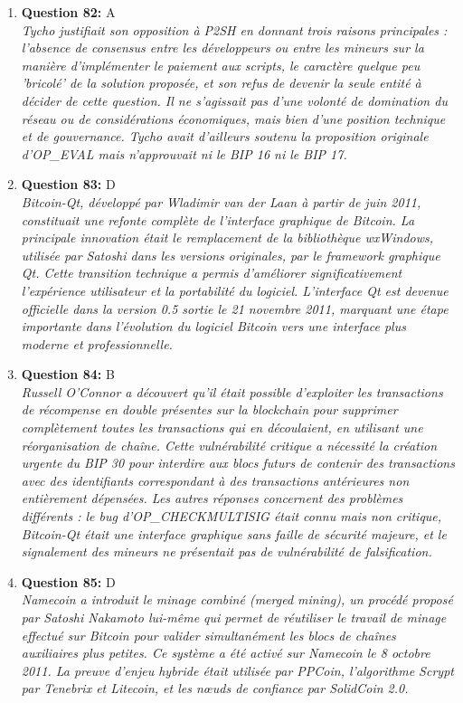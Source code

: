 \documentclass[12pt,a4paper]{article}
\begin{document}
\begin{enumerate}
\item \textbf{Question 82:} A
\\ \textit{Tycho justifiait son opposition à P2SH en donnant trois raisons principales : l'absence de consensus entre les développeurs ou entre les mineurs sur la manière d'implémenter le paiement aux scripts, le caractère quelque peu 'bricolé' de la solution proposée, et son refus de devenir la seule entité à décider de cette question. Il ne s'agissait pas d'une volonté de domination du réseau ou de considérations économiques, mais bien d'une position technique et de gouvernance. Tycho avait d'ailleurs soutenu la proposition originale d'OP_EVAL mais n'approuvait ni le BIP 16 ni le BIP 17.}

\item \textbf{Question 83:} D
\\ \textit{Bitcoin-Qt, développé par Wladimir van der Laan à partir de juin 2011, constituait une refonte complète de l'interface graphique de Bitcoin. La principale innovation était le remplacement de la bibliothèque wxWindows, utilisée par Satoshi dans les versions originales, par le framework graphique Qt. Cette transition technique a permis d'améliorer significativement l'expérience utilisateur et la portabilité du logiciel. L'interface Qt est devenue officielle dans la version 0.5 sortie le 21 novembre 2011, marquant une étape importante dans l'évolution du logiciel Bitcoin vers une interface plus moderne et professionnelle.}

\item \textbf{Question 84:} B
\\ \textit{Russell O'Connor a découvert qu'il était possible d'exploiter les transactions de récompense en double présentes sur la blockchain pour supprimer complètement toutes les transactions qui en découlaient, en utilisant une réorganisation de chaîne. Cette vulnérabilité critique a nécessité la création urgente du BIP 30 pour interdire aux blocs futurs de contenir des transactions avec des identifiants correspondant à des transactions antérieures non entièrement dépensées. Les autres réponses concernent des problèmes différents : le bug d'OP_CHECKMULTISIG était connu mais non critique, Bitcoin-Qt était une interface graphique sans faille de sécurité majeure, et le signalement des mineurs ne présentait pas de vulnérabilité de falsification.}

\item \textbf{Question 85:} D
\\ \textit{Namecoin a introduit le minage combiné (merged mining), un procédé proposé par Satoshi Nakamoto lui-même qui permet de réutiliser le travail de minage effectué sur Bitcoin pour valider simultanément les blocs de chaînes auxiliaires plus petites. Ce système a été activé sur Namecoin le 8 octobre 2011. La preuve d'enjeu hybride était utilisée par PPCoin, l'algorithme Scrypt par Tenebrix et Litecoin, et les nœuds de confiance par SolidCoin 2.0.}


\end{enumerate}
\end{document}
